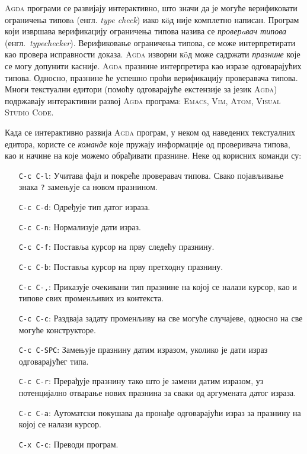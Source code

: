 \documentclass[12pt,oneside]{memoir}
\begin{document}
\textsc{Agda} програми се развијају интерактивно, што значи да је могуће верификовати ограничења типовa (енгл. \emph{type check}) иако к{\"o}д није комплетно написан. Програм који извршава верификацију ограничења типова назива се \emph{проверaвач типова} (енгл.~\emph{typechecker}). Верификовање ограничења типова, се може интерпретирати као провера исправности доказа. \textsc{Agda} изворни к{\"o}д може садржати \emph{празнине} које се могу допунити касније. \textsc{Agda} празнине интерпретира као изразе одговарајућих типова. Односно, празнине ће успешно проћи верификацију проверавача типова. Многи текстуални едитори (помоћу одговарајуће екстензије за језик \textsc{Agda}) подржавају интерактивни развој \textsc{Agda} програма: \textsc{Emacs}, \textsc{Vim}, \textsc{Atom}, \textsc{Visual Studio Code}.

Када се интерактивно развија \textsc{Agda} програм, у неком од наведених текстуалних едитора, користе се \emph{команде} које пружају информације од проверивача типова, као и начине на које можемо обрађивати празнине. Неке од корисних команди су:

\begin{itemize}
    \item[\texttt{C-c C-l}:]{Учитава фајл и покреће проверавач типова. Свако појављивање знака \texttt{?} замењује са новом празнином.}
    \item[\texttt{C-c C-d}:]{Одређује тип датог израза.}
    \item[\texttt{C-c C-n}:]{Нормализује дати израз.}
    \item[\texttt{C-c C-f}:]{Поставља курсор на прву следећу празнину.}
    \item[\texttt{C-c C-b}:]{Поставља курсор на прву претходну празнину.}
    \item[\texttt{C-c C-,}:]{Приказује очекивани тип празнине на којој се налази курсор, као и типове свих променљивих из контекста.}
    \item[\texttt{C-c C-c}:]{Раздваја задату променљиву на све могуће случајеве, односно на све могуће конструкторе.}
    \item[\texttt{C-c C-SPC}:]{Замењује празнину датим изразом, уколико је дати израз одговарајућег типа.}
    \item[\texttt{C-c C-r}:]{Прерађује празнину тако што је замени датим изразом, уз потенцијално отварање нових празнина за сваки од аргумената датог израза.}
    \item[\texttt{C-c C-a}:]{Аутоматски покушава да пронађе одговарајући израз за празнину на којој се налази курсор.}
    \item[\texttt{C-x C-c}:]{Преводи програм.}
\end{itemize}
\end{document}
